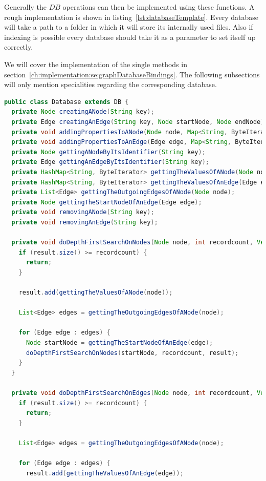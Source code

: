 Generally the $ DB $ operations can then be implemented using these functions.
A rough implementation is shown in listing~\ref{lst:databaseTemplate}.
Every database will take a path to a folder in which it will store its internally used files.
Also if indexing is possible every database should take it as a parameter to set itself up correctly.

We will cover the implementation of the single methods in section~\ref{ch:implementation:se:graphDatabaseBindings}.
The following subsections will only mention specialities regarding the corresponding database.

\begin{lstlisting}[language={Java},label={lst:databaseTemplate},caption={Generic example of a database implementation with the use of graph data.}]
public class Database extends DB {
  private Node creatingANode(String key);
  private Edge creatingAnEdge(String key, Node startNode, Node endNode);
  private void addingPropertiesToANode(Node node, Map<String, ByteIterator> values);
  private void addingPropertiesToAnEdge(Edge edge, Map<String, ByteIterator> values);
  private Node gettingANodeByItsIdentifier(String key);
  private Edge gettingAnEdgeByItsIdentifier(String key);
  private HashMap<String, ByteIterator> gettingTheValuesOfANode(Node node);
  private HashMap<String, ByteIterator> gettingTheValuesOfAnEdge(Edge edge);
  private List<Edge> gettingTheOutgoingEdgesOfANode(Node node);
  private Node gettingTheStartNodeOfAnEdge(Edge edge);
  private void removingANode(String key);
  private void removingAnEdge(String key);

  private void doDepthFirstSearchOnNodes(Node node, int recordcount, Vector<HashMap<String, ByteIterator>> result) {
    if (result.size() >= recordcount) {
      return;
    }

    result.add(gettingTheValuesOfANode(node));

    List<Edge> edges = gettingTheOutgoingEdgesOfANode(node);

    for (Edge edge : edges) {
      Node startNode = gettingTheStartNodeOfAnEdge(edge);
      doDepthFirstSearchOnNodes(startNode, recordcount, result);
    }
  }

  private void doDepthFirstSearchOnEdges(Node node, int recordcount, Vector<HashMap<String, ByteIterator>> result) {
    if (result.size() >= recordcount) {
      return;
    }

    List<Edge> edges = gettingTheOutgoingEdgesOfANode(node);

    for (Edge edge : edges) {
      result.add(gettingTheValuesOfAnEdge(edge));


\end{lstlisting}
